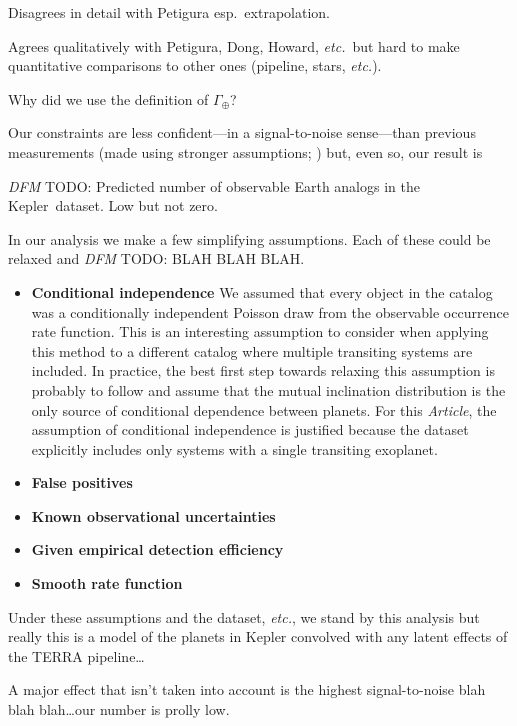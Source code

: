 \documentclass[12pt,preprint]{aastex}
\newcommand{\project}[1]{{\sffamily #1}}
\newcommand{\kepler}{\project{Kepler}}
\newcommand{\paper}{\textsl{Article}}
\newcommand{\foreign}[1]{\emph{#1}}
\newcommand{\etc}{\foreign{etc.}}
\newcommand{\todo}[3]{{\color{#2} \emph{#1} TODO: #3}}
\newcommand{\dfmtodo}[1]{\todo{DFM}{red}{#1}}
\newcommand{\rate}{\ensuremath{\Gamma}}
\newcommand{\gammaearth}{{\ensuremath{\rate_\oplus}}}
\begin{document}
Disagrees in detail with Petigura esp.\ extrapolation.

Agrees qualitatively with Petigura, Dong, Howard, \etc\ but hard to make
quantitative comparisons to other ones (pipeline, stars, \etc).

Why did we use the definition of \gammaearth?

Our constraints are less confident---in a signal-to-noise sense---than
previous measurements (made using stronger assumptions; \citealt{petigura})
but, even so, our result is

\dfmtodo{%
Predicted number of observable Earth analogs in the \kepler\ dataset.
Low but not zero.
}

In our analysis we make a few simplifying assumptions.
Each of these could be relaxed and \dfmtodo{BLAH BLAH BLAH}.
\begin{itemize}

\item {\bf Conditional independence}\quad
We assumed that every object in the catalog was a conditionally independent
Poisson draw from the observable occurrence rate function.
This is an interesting assumption to consider when applying this method to a
different catalog where multiple transiting systems are included.
In practice, the best first step towards relaxing this assumption is probably
to follow \citet{tremaine} and assume that the mutual inclination distribution
is the only source of conditional dependence between planets.
For this \paper, the assumption of conditional independence is justified
because the dataset explicitly includes only systems with a single transiting
exoplanet.

\item {\bf False positives}\quad

\item {\bf Known observational uncertainties}\quad

\item {\bf Given empirical detection efficiency}\quad

\item {\bf Smooth rate function}\quad

\end{itemize}

Under these assumptions and the dataset, \etc, we stand by this analysis but
really this is a model of the planets in Kepler convolved with any latent
effects of the TERRA pipeline\ldots

A major effect that isn't taken into account is the highest signal-to-noise
blah blah blah\ldots our number is prolly low.
\end{document}
